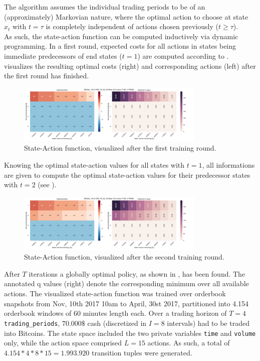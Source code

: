 The algorithm assumes the individual trading periods to be of an (approximately) Markovian nature, where the optimal action to choose at state $x_t$ with $t = \tau$ is completely independent of actions chosen previously ($t \geq \tau$).\\

As such, the state-action function can be computed inductively via dynamic programming. In a first round, expected costs for all actions in states being immediate predecessors of end states (\ie $t=1$) are computed according to .  visualizes the resulting optimal costs (right) and corresponding actions (left) after the first round has finished.

\begin{figure}[ht]
	\centering
   \includegraphics[width=0.8\textwidth]{content/drawings/heatmap_3months_t1}
	\caption{State-Action function, visualized after the first training round.}
	\label{fig:heatmap:t1}
\end{figure}

Knowing the optimal state-action values for all states with $t=1$, all informations are given to compute the optimal state-action values for their predecessor states with $t=2$ (see ).

\begin{figure}[ht]
	\centering
   \includegraphics[width=0.8\textwidth]{content/drawings/heatmap_3months_t2}
	\caption{State-Action function, visualized after the second training round.}
	\label{fig:heatmap:t2}
\end{figure}

After $T$ iterations a globally optimal policy, as shown in , has been found. The annotated q values (right) denote the corresponding minimum over all available actions. The visualized state-action function was trained over orderbook snapshots from Nov, 10th 2017 10am to April, 30st 2017, partitioned into 4.154 orderbook windows of 60 minutes length each. Over a trading horizon of $T=4$ \lstinline!trading_periods!, $70.000\$$ cash (discretized in $I=8$ intervals) had to be traded into Bitcoins. The state space included the two private variables \lstinline!time! and \lstinline!volume! only, while the action space comprised $L=15$ actions. As such, a total of $4.154 * 4 * 8 * 15 = 1.993.920$ transition tuples were generated.

